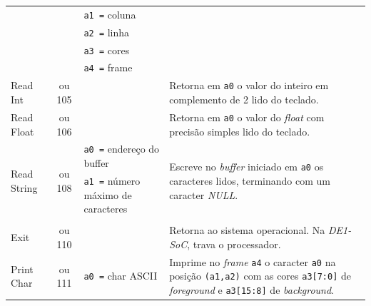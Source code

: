 \begin{longtable}{|l|c|p{3cm}|l |}
            & & \texttt{a1 =} coluna      & \\*
            & & \texttt{a2 =} linha       & \\*
            & & \texttt{a3 =} cores       & \\*
            & & \texttt{a4 =} frame       & \\
        \hline
        \multirow{3}{*}{Read Int}           & \multirow{3}{*}{\parbox{0.6cm}{ ou 105}}
            &                               & \multirow{3}{*}{\parbox{7cm}{Retorna em \texttt{a0} o valor do inteiro em complemento de 2 lido do teclado.}}\\*
            & & & \\*
            & & & \\
        \hline
        \multirow{3}{*}{Read Float}         & \multirow{3}{*}{\parbox{0.6cm}{ ou 106}}
            &                               & \multirow{3}{*}{\parbox{7cm}{Retorna em \texttt{a0} o valor do \textit{float} com precisão simples lido do teclado.}}\\*
            & & & \\*
            & & & \\
        \hline
        \multirow{3}{*}{Read String}        & \multirow{3}{*}{\parbox{0.6cm}{ ou 108}}
            & \texttt{a0 =} endereço do buffer    & \multirow{3}{*}{\parbox{7cm}{Escreve no \textit{buffer} iniciado em \texttt{a0} os caracteres lidos, terminando com um caracter \textit{NULL}.}}\\*
            & & \texttt{a1 =} número máximo de caracteres & \\*
            & & & \\
        \hline
        \multirow{3}{*}{Exit}               & \multirow{3}{*}{\parbox{0.6cm}{ ou 110}}
            &                               & \multirow{3}{*}{\parbox{7cm}{Retorna ao sistema operacional. Na \textit{DE1-SoC}, trava o processador.}}\\*
            & & & \\*
            & & & \\
        \hline
        \multirow{5}{*}{Print Char}         & \multirow{5}{*}{\parbox{0.6cm}{ ou 111}}
              & \texttt{a0 =} char ASCII  & \multirow{5}{*}{\parbox{7cm}{Imprime no \textit{frame} \texttt{a4} o caracter \texttt{a0} na
                                                posição \texttt{(a1,a2)} com as cores \texttt{a3[7:0]} de \textit{foreground} e \texttt{a3[15:8]} de \textit{background}.}}\\*

\end{longtable}

